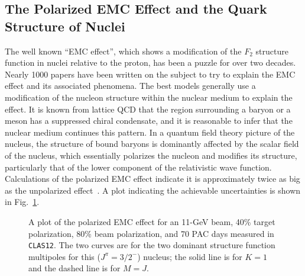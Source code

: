 \subsection{The Polarized EMC Effect and the Quark Structure of Nuclei}

The well known ``EMC effect'', which shows a modification of the
$F_2$ structure function in nuclei relative to the proton, has been
a puzzle for over two decades.  Nearly 1000 papers have been written
on the subject to try to explain the EMC effect and its associated
phenomena.  The best models generally use a modification of the nucleon 
structure within the nuclear medium to explain the effect.  It is
known from lattice QCD that the region surrounding a baryon or a meson
has a suppressed chiral condensate, and it is reasonable to infer that
the nuclear medium continues this pattern.  In a quantum field theory
picture of the nucleus, the structure of bound baryons is dominantly
affected by the scalar field of the nucleus, which essentially
polarizes the nucleon and modifies its structure, particularly that of
the lower component of the relativistic wave function.  Calculations of
the polarized EMC effect indicate it is approximately twice as big as
the unpolarized effect~\cite{CLOET}.  A plot indicating the achievable
uncertainties is shown in Fig.~\ref{p_emc}.

\begin{figure}[htbp]
\vspace{6.5cm}
\caption{\small{A plot of the polarized EMC effect for an 11-GeV beam, 40\% 
target polarization, 80\% beam polarization, and 70 PAC days measured in 
{\tt CLAS12}. The two curves are for the two dominant structure function 
multipoles for this ($J^{\pi}=3/2^-$) nucleus; the solid line is for $K=1$ 
and the dashed line is for $M=J$.}}
\label{p_emc}
\end{figure}
